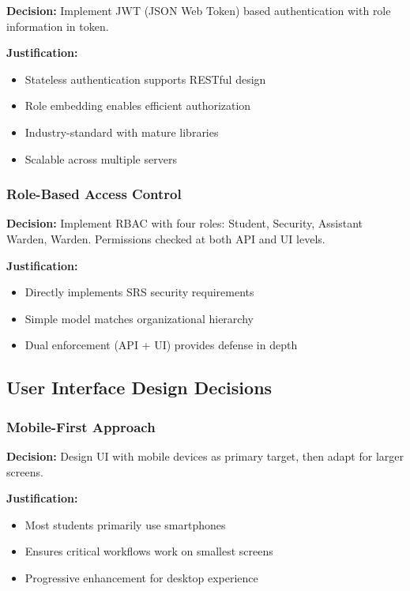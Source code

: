 \documentclass[12pt]{article}
\begin{document}
\textbf{Decision:} Implement JWT (JSON Web Token) based authentication with role information in token.

\textbf{Justification:}

\begin{itemize}
\item Stateless authentication supports RESTful design
\item Role embedding enables efficient authorization
\item Industry-standard with mature libraries
\item Scalable across multiple servers
\end{itemize}

\subsubsection{Role-Based Access Control}

\textbf{Decision:} Implement RBAC with four roles: Student, Security, Assistant Warden, Warden. Permissions checked at both API and UI levels.

\textbf{Justification:}

\begin{itemize}
\item Directly implements SRS security requirements
\item Simple model matches organizational hierarchy
\item Dual enforcement (API + UI) provides defense in depth
\end{itemize}

\subsection{User Interface Design Decisions}

\subsubsection{Mobile-First Approach}

\textbf{Decision:} Design UI with mobile devices as primary target, then adapt for larger screens.

\textbf{Justification:}

\begin{itemize}
\item Most students primarily use smartphones
\item Ensures critical workflows work on smallest screens
\item Progressive enhancement for desktop experience
\end{itemize}
\end{document}
